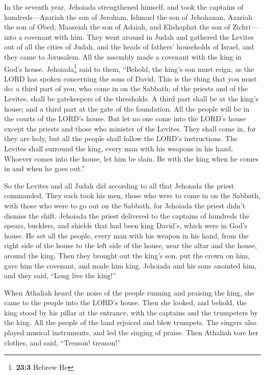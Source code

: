  In the seventh year, Jehoiada strengthened himself, and
took the captains of hundreds---Azariah the son of Jeroham, Ishmael the
son of Jehohanan, Azariah the son of Obed, Maaseiah the son of Adaiah,
and Elishaphat the son of Zichri---into a covenant with him.
 They went around in Judah and gathered the Levites out of
all the cities of Judah, and the heads of fathers' households of Israel,
and they came to Jerusalem.  All the assembly made a
covenant with the king in God's house. Jehoiada\footnote{\textbf{23:3}
  Hebrew He} said to them, ``Behold, the king's son must reign, as the
LORD has spoken concerning the sons of David.  This is the
thing that you must do: a third part of you, who come in on the Sabbath,
of the priests and of the Levites, shall be gatekeepers of the
thresholds.  A third part shall be at the king's house;
and a third part at the gate of the foundation. All the people will be
in the courts of the LORD's house.  But let no one come
into the LORD's house except the priests and those who minister of the
Levites. They shall come in, for they are holy, but all the people shall
follow the LORD's instructions.  The Levites shall
surround the king, every man with his weapons in his hand. Whoever comes
into the house, let him be slain. Be with the king when he comes in and
when he goes out.''

 So the Levites and all Judah did according to all that
Jehoiada the priest commanded. They each took his men, those who were to
come in on the Sabbath, with those who were to go out on the Sabbath,
for Jehoiada the priest didn't dismiss the shift. 
Jehoiada the priest delivered to the captains of hundreds the spears,
bucklers, and shields that had been king David's, which were in God's
house.  He set all the people, every man with his weapon
in his hand, from the right side of the house to the left side of the
house, near the altar and the house, around the king. 
Then they brought out the king's son, put the crown on him, gave him the
covenant, and made him king. Jehoiada and his sons anointed him, and
they said, ``Long live the king!''

 When Athaliah heard the noise of the people running and
praising the king, she came to the people into the LORD's house.
 Then she looked, and behold, the king stood by his
pillar at the entrance, with the captains and the trumpeters by the
king. All the people of the land rejoiced and blew trumpets. The singers
also played musical instruments, and led the singing of praise. Then
Athaliah tore her clothes, and said, ``Treason! treason!''

